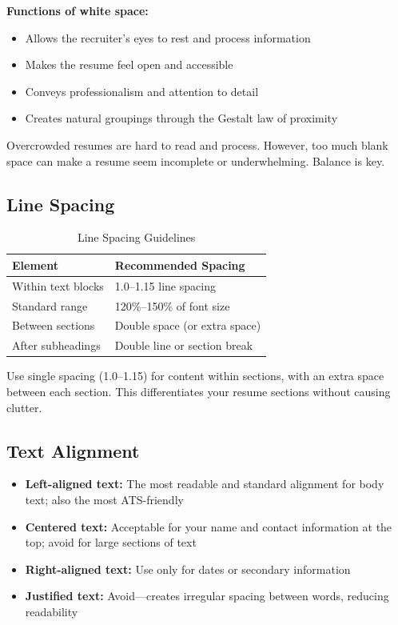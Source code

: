 \documentclass[11pt,a4paper]{article}
\begin{document}
\textbf{Functions of white space:}
\begin{itemize}
    \item Allows the recruiter's eyes to rest and process information
    \item Makes the resume feel open and accessible
    \item Conveys professionalism and attention to detail
    \item Creates natural groupings through the Gestalt law of proximity
\end{itemize}

\begin{warning}
Overcrowded resumes are hard to read and process. However, too much blank space can make a resume seem incomplete or underwhelming. Balance is key.
\end{warning}

\subsection{Line Spacing}

\begin{table}[h]
\centering
\begin{tabular}{@{}ll@{}}
\toprule
\textbf{Element} & \textbf{Recommended Spacing} \\
\midrule
Within text blocks & 1.0--1.15 line spacing \\
Standard range & 120\%--150\% of font size \\
Between sections & Double space (or extra space) \\
After subheadings & Double line or section break \\
\bottomrule
\end{tabular}
\caption{Line Spacing Guidelines}
\end{table}

\begin{bestpractice}
Use single spacing (1.0--1.15) for content within sections, with an extra space between each section. This differentiates your resume sections without causing clutter.
\end{bestpractice}

\subsection{Text Alignment}

\begin{itemize}
    \item \textbf{Left-aligned text:} The most readable and standard alignment for body text; also the most ATS-friendly
    \item \textbf{Centered text:} Acceptable for your name and contact information at the top; avoid for large sections of text
    \item \textbf{Right-aligned text:} Use only for dates or secondary information
    \item \textbf{Justified text:} Avoid---creates irregular spacing between words, reducing readability
\end{itemize}
\end{document}
